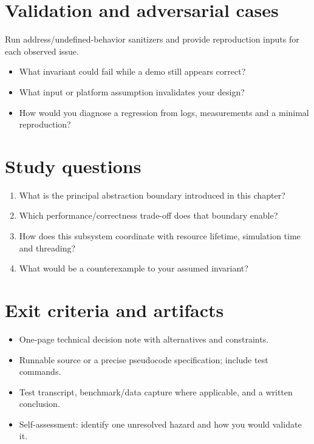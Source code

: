 \documentclass[11pt,letterpaper]{article}
\begin{document}
\section{Validation and adversarial cases}
Run address/undefined-behavior sanitizers and provide reproduction inputs for each observed issue.

\begin{itemize}
\item What invariant could fail while a demo still appears correct?
\item What input or platform assumption invalidates your design?
\item How would you diagnose a regression from logs, measurements and a minimal reproduction?
\end{itemize}
\section{Study questions}
\begin{enumerate}
\item What is the principal abstraction boundary introduced in this chapter?
\item Which performance/correctness trade-off does that boundary enable?
\item How does this subsystem coordinate with resource lifetime, simulation time and threading?
\item What would be a counterexample to your assumed invariant?
\end{enumerate}
\section{Exit criteria and artifacts}
\begin{itemize}
\item One-page technical decision note with alternatives and constraints.
\item Runnable source or a precise pseudocode specification; include test commands.
\item Test transcript, benchmark/data capture where applicable, and a written conclusion.
\item Self-assessment: identify one unresolved hazard and how you would validate it.
\end{itemize}
\end{document}
